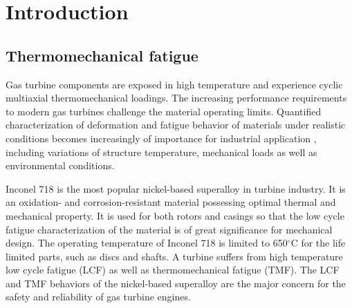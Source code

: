 ﻿\chapter{Introduction}

\section{Thermomechanical fatigue}
\noindent
Gas turbine components are exposed in high temperature and experience cyclic multiaxial thermomechanical loadings. The increasing performance requirements to modern gas turbines challenge the material operating limits. Quantified characterization of deformation and fatigue behavior of materials under realistic conditions becomes increasingly of importance for industrial application \cite{harrison1996modelling}, including variations of structure temperature, mechanical loads as well as environmental conditions. 

Inconel 718 is the most popular nickel-based superalloy in turbine industry. It is an oxidation- and corrosion-resistant material possessing optimal thermal and mechanical property. 
It is used for both rotors and casings so that the low cycle fatigue characterization of the material is of great significance for mechanical design. The operating temperature of Inconel 718 is limited to 650$^\circ$C for the life limited parts, such as discs and shafts.
A turbine suffers from high temperature low cycle fatigue (LCF) as well as thermomechanical fatigue (TMF).
The LCF and TMF behaviors of the nickel-based superalloy are the major concern for the safety and reliability of gas turbine engines.


